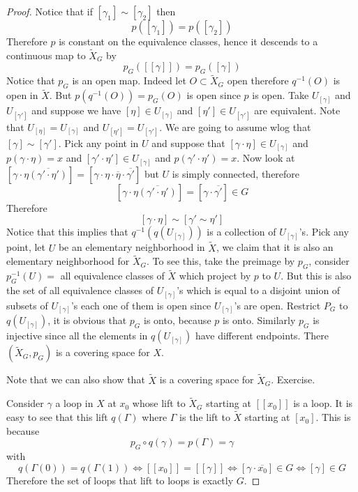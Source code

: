 \documentclass[11pt,a4paper]{article}
\theoremstyle{definition}
\theoremstyle{plain}
\theoremstyle{remark}
\newcommand{\1}{\mathbbm{1}}
\begin{document}
\begin{proof}
    Notice that if $[\gamma_1]\sim [\gamma_2]$ then 
    $$p([\gamma_1]) = p([\gamma_2])$$
    Therefore $p$ is constant on the equivalence classes, hence it descends to a continuous map to $\tilde{X}_G$ by 
    $$p_G([[\gamma]]) = p_G([\gamma])$$
    Notice that $p_G$ is an open map. Indeed let $O \subset \tilde{X}_G$ open therefore $q^{-1}(O)$ is open in $\tilde{X}$. 
    But $p(q^{-1}(O)) = p_G (O)$ is open since $p$ is open. Take $U_[\gamma]$ and $U_{[\gamma']}$ and suppose we have 
    $[\eta] \in U_{[\gamma]} $ and $[\eta'] \in U_{[\gamma']}$ are equivalent. Note that $U_{[\eta]} = U_{[\gamma]}$ and 
    $U_{[\eta']} = U_{[\gamma']}$. We are going to assume wlog that $[\gamma] \sim [\gamma']$. Pick any point in $U$ and suppose that 
    $[\gamma \cdot \eta] \in U_{[\gamma]}$ and $p(\gamma \cdot \eta) = x$ and $[\gamma' \cdot \eta'] \in U_{[\gamma]}$ and $p(\gamma' \cdot \eta') = x$. 
    Now look at $[\gamma \cdot \eta \overline{(\gamma' \cdot \eta')}]  = [\gamma \cdot \eta \cdot \overline{\eta} \cdot \overline{\gamma'}]$ but 
    $U$ is simply connected, therefore 
    $$[\gamma \cdot \eta \overline{(\gamma' \cdot \eta')}]  = [\gamma \cdot \overline{\gamma'}] \in G$$
    Therefore 
    $$[\gamma \cdot \eta] \sim [\gamma' \sim \eta']$$
    Notice that this implies that $q^{-1}(q(U_{[\gamma]}))$ is a collection of $U_{[\gamma]}$'s. Pick any point, let $U$ be an 
    elementary neighborhood in $\tilde{X}$, we claim that it is also an elementary neighborhood for $\tilde{X}_G$. To see this, take the preimage by $p_G$, 
    consider $p_G^{-1}(U) = $ all equivalence classes of $\tilde{X}$ which project by $p$ to $U$. But this is also the set of all equivalence 
    classes of $U_{[\gamma]}$'s which is equal to a disjoint union of subsets of $U_{[\gamma]}$'s each one of them is open since $U_{[\gamma]}$'s are open.
    Restrict $P_G$ to $q(U_{[\gamma]})$, it is obvious that $p_G$ is onto, because $p$ is onto. Similarly $p_G$ is injective since all the elements in $q(U_{[\gamma]})$ 
    have different endpoints. There $(\tilde{X}_G, p_G)$ is a covering space for $X$. 
    
    Note that we can also show that $\tilde{X}$ is a covering space for $\tilde{X}_G$. Exercise. 

    Consider $\gamma$ a loop in $X$ at $x_0$ whose lift to $\tilde{X}_G$ starting at $[[x_0]]$ is a loop. It is easy to see that 
    this lift $q(\Gamma)$ where $\Gamma$ is the lift to $\tilde{X}$ starting at $[x_0]$. This is because 
    $$p_G \circ q (\gamma) = p(\Gamma) = \gamma$$
    with 
    $$q(\Gamma(0)) = q(\Gamma(1)) \iff [[x_0]] = [[\gamma]] \iff [\gamma \cdot \overline{x_0}] \in G \iff [\gamma] \in G$$
    Therefore the set of loops that lift to loops is exactly $G$.  
\end{proof}
\end{document}
